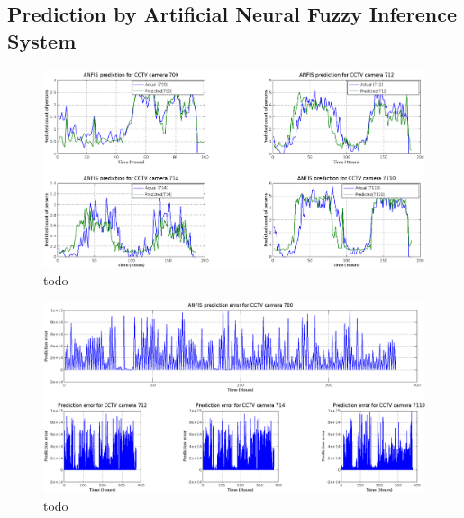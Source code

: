 \subsection{Prediction by Artificial Neural Fuzzy Inference System}

\begin{figure}
\centering
     \includegraphics[width=\textwidth]{Figures/Figure_Prediction.png}
 \caption{todo}
\end{figure}

\begin{figure}
\centering
    \includegraphics[width=\textwidth]{Figures/Figure_PredictionError.png}
 \caption{todo}
\end{figure}

